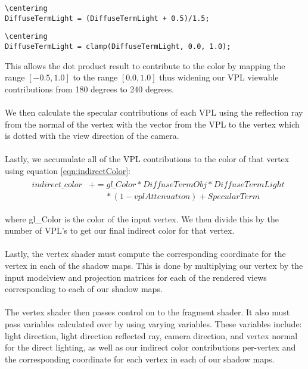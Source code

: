 \begin{lstlisting}
\centering
DiffuseTermLight = (DiffuseTermLight + 0.5)/1.5;
\end{lstlisting}

\begin{lstlisting}
\centering
DiffuseTermLight = clamp(DiffuseTermLight, 0.0, 1.0);
\end{lstlisting}

This allows the dot product result to contribute to the color by mapping the range $[-0.5, 1.0]$ to the range $[0.0, 1.0]$ thus widening our VPL viewable contributions from 180 degrees to 240 degrees.

\paragraph{}
We then calculate the specular contributions of each VPL using the reflection ray from the normal of the vertex with the vector from the VPL to the vertex which is dotted with the view direction of the camera.

\paragraph{}
Lastly, we accumulate all of the VPL contributions to the color of that vertex using equation \ref{eqn:indirectColor}:
\begin{align}
  &\begin{aligned} \label{eqn:indirectColor}
    indirect\_color &+= gl\_Color*DiffuseTermObj*DiffuseTermLight\\
      &\qquad *(1-vplAttenuation)+SpecularTerm
  \end{aligned}
\end{align}

where gl\_Color is the color of the input vertex.  We then divide this by the number of VPL's to get our final indirect color for that vertex.

\paragraph{}
Lastly, the vertex shader must compute the corresponding coordinate for the vertex in each of the shadow maps.  This is done by multiplying our vertex by the input modelview and projection matrices for each of the rendered views corresponding to each of our shadow maps.

\paragraph{}
The vertex shader then passes control on to the fragment shader.  It also must pass variables calculated over by using varying variables.  These variables include: light direction, light direction reflected ray, camera direction, and vertex normal for the direct lighting, as well as our indirect color contributions per-vertex and the corresponding coordinate for each vertex in each of our shadow maps.

